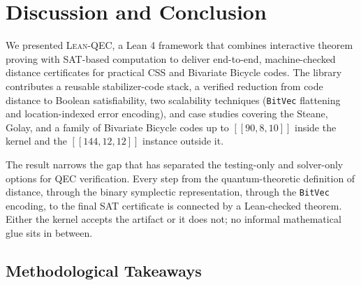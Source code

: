 \section{Discussion and Conclusion}\label{sec:Conclusion and Discussion}

%
%

We presented \textsc{Lean-QEC}, a Lean 4 framework that combines interactive
theorem proving with SAT-based computation to deliver end-to-end,
machine-checked distance certificates for practical CSS and Bivariate Bicycle
codes. The library contributes a reusable stabilizer-code stack, a verified
reduction from code distance to Boolean satisfiability, two scalability
techniques (\lstinline{BitVec} flattening and location-indexed error encoding),
and case studies covering the Steane, Golay, and a family of Bivariate Bicycle codes up to $[[90, 8, 10]]$ inside
the kernel and the $[[144,12,12]]$ instance outside it.

The result narrows the gap that has separated the testing-only and solver-only
options for QEC verification. Every step from the quantum-theoretic definition
of distance, through the binary symplectic representation, through the
\lstinline{BitVec} encoding, to the final SAT certificate is connected by a
Lean-checked theorem. Either the kernel accepts the artifact or it does not; no
informal mathematical glue sits in between.

\subsection{Methodological Takeaways}\label{sec:method}


